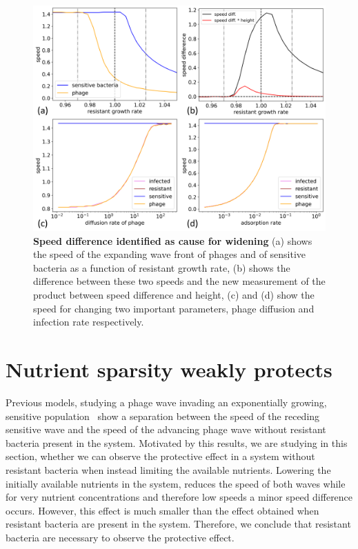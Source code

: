 \begin{figure}
\centering
\includegraphics[width=\linewidth]{graphics/2025_09_30_phages_fig8.png}
\caption{\textbf{Speed difference identified as cause for widening} (a) shows the speed of the expanding wave front of phages and of sensitive bacteria as a function of resistant growth rate, (b) shows the difference between these two speeds and the new measurement of the product between speed difference and height, (c) and (d) show the speed for changing two important parameters, phage diffusion and infection rate respectively.}
\label{fig:results_speed_height}
\end{figure}

\section{Nutrient sparsity weakly protects}
Previous models, studying a phage wave invading an exponentially growing, sensitive population~\cite{Claydon2021-cu} show a separation between the speed of the receding sensitive wave and the speed of the advancing phage wave without resistant bacteria present in the system. Motivated by this results, we are studying in this section, whether we can observe the protective effect in a system without resistant bacteria when instead limiting the available nutrients. Lowering the initially available nutrients in the system, reduces the speed of both waves while for very nutrient concentrations and therefore low speeds a minor speed difference occurs. However, this effect is much smaller than the effect obtained when resistant bacteria are present in the system. Therefore, we conclude that resistant bacteria are necessary to observe the protective effect.

